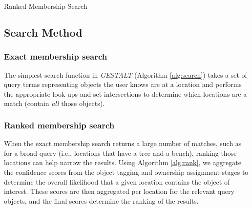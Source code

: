 \begin{algorithm}[h]
    \caption{Ranked Membership Search}\label{alg:rank}
    \begin{algorithmic}
        \State{- - - - -}
                                                                
                                                        \EndFor
            \EndFor
        \EndProcedure
    \end{algorithmic}
\end{algorithm}
\normalsize

\subsection{Search Method} \label{subsection:search-method}

\subsubsection{\textbf{Exact membership search}}
The simplest search function in \emph{GESTALT} (Algorithm \ref{alg:search}) takes a set of query terms representing objects the user knows are at a location and performs the appropriate look-ups and set intersections to determine which locations are a match (contain \textit{all} those objects).



\subsubsection{\textbf{Ranked membership search}}
When the exact membership search returns a large number of matches, such as for a broad query (i.e., locations that have a tree and a bench), ranking those locations can help narrow the results. Using Algorithm \ref{alg:rank}, we aggregate the confidence scores from the object tagging and ownership assignment stages to determine the overall likelihood that a given location contains the object of interest. These scores are then aggregated per location for the relevant query objects, and the final scores determine the ranking of the results. 




